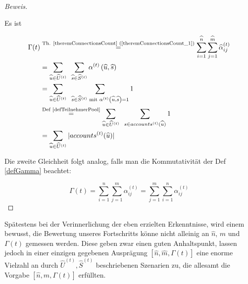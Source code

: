 \vspace{0.3cm}

\begin{proof}[Beweis] \textrm{ }

\vspace{0.3cm}

Es ist

\begin{align*}
\Gamma(t)&\overset{\text{Th. \ref{theremConnectionsCount} (\ref{theremConnectionsCount_1})}}{=} \sum_{i=1}^{\widehat{n}} \sum_{j=1}^{\widehat{m}} \widehat{\alpha}^{(t)}_{ij} \\
&= \sum_{\widehat{u} \in \widehat{U}^{(t)}} \textrm{  } \sum_{\widehat{s} \in \widehat{S}^{(t)}} \alpha^{(t)}\left(\widehat{u}, \widehat{s}\right) \\
&= \sum_{\widehat{u} \in \widehat{U}^{(t)}} \textrm{  } \sum_{\widehat{s} \in \widehat{S}^{(t)} \textrm{ mit } \alpha^{(t)}\left(\widehat{u}, \widehat{s}\right) = 1} 1 \\
&\overset{\text{Def \ref{defTeilnehmerPool}}}{=} \sum_{\widehat{u} \in \widehat{U}^{(t)}} \textrm{  } \sum_{s \in accounts^{(t)} (\widehat{u})} 1 \\
&= \sum_{\widehat{u} \in \widehat{U}^{(t)}} |accounts^{(t)} (\widehat{u})|
\end{align*}
 
\vspace{0.3cm}

Die zweite Gleichheit folgt analog, falls man die Kommutativität der Def \ref{defGamma} beachtet: 

\begin{equation*}
  \Gamma(t)= \sum_{i=1}^n \sum_{j=1}^m \alpha^{(t)}_{ij} = \sum_{j=1}^m \sum_{i=1}^n \alpha^{(t)}_{ij}
\end{equation*}

\end{proof}

\vspace{0.6cm}

Spätestens bei der Verinnerlichung der eben erzielten Erkenntnisse, wird einem bewusst, die Bewertung unseres Fortschritts könne nicht alleinig an $\widehat{n}$, $\widehat{m}$ und $\Gamma(t)$ gemessen werden. Diese geben zwar einen guten Anhaltspunkt, lassen jedoch in einer einzigen gegebenen Ausprägung $\left[ \widehat{n}, \widehat{m}, \Gamma(t) \right]$ eine enorme Vielzahl an durch $\widehat{U}^{(t)}, \widehat{S}^{(t)}$ beschriebenen Szenarien zu, die allesamt die Vorgabe $\left[ \widehat{n}, \widehat{m}, \Gamma(t) \right]$ erfüllten.

